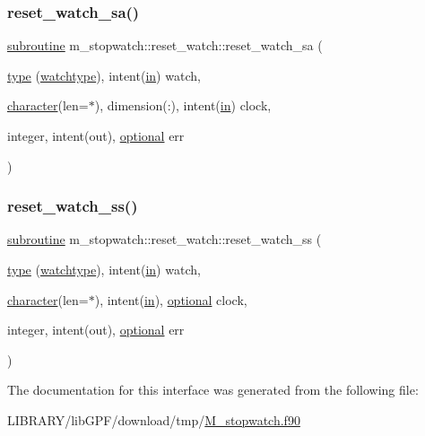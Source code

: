 \subsubsection{\texorpdfstring{reset\+\_\+watch\+\_\+sa()}{reset\_watch\_sa()}}
{\footnotesize\ttfamily \hyperlink{M__stopwatch_83_8txt_acfbcff50169d691ff02d4a123ed70482}{subroutine} m\+\_\+stopwatch\+::reset\+\_\+watch\+::reset\+\_\+watch\+\_\+sa (\begin{DoxyParamCaption}\item[{\hyperlink{stop__watch_83_8txt_a70f0ead91c32e25323c03265aa302c1c}{type} (\hyperlink{structm__stopwatch_1_1watchtype}{watchtype}), intent(\hyperlink{M__journal_83_8txt_afce72651d1eed785a2132bee863b2f38}{in})}]{watch,  }\item[{\hyperlink{option__stopwatch_83_8txt_abd4b21fbbd175834027b5224bfe97e66}{character}(len=$\ast$), dimension(\+:), intent(\hyperlink{M__journal_83_8txt_afce72651d1eed785a2132bee863b2f38}{in})}]{clock,  }\item[{integer, intent(out), \hyperlink{option__stopwatch_83_8txt_aa4ece75e7acf58a4843f70fe18c3ade5}{optional}}]{err }\end{DoxyParamCaption})\hspace{0.3cm}{\ttfamily [private]}}

\mbox{\label{interfacem__stopwatch_1_1reset__watch_ad5423f320af136dc18db5bbcf410ede1}} 
\subsubsection{\texorpdfstring{reset\+\_\+watch\+\_\+ss()}{reset\_watch\_ss()}}
{\footnotesize\ttfamily \hyperlink{M__stopwatch_83_8txt_acfbcff50169d691ff02d4a123ed70482}{subroutine} m\+\_\+stopwatch\+::reset\+\_\+watch\+::reset\+\_\+watch\+\_\+ss (\begin{DoxyParamCaption}\item[{\hyperlink{stop__watch_83_8txt_a70f0ead91c32e25323c03265aa302c1c}{type} (\hyperlink{structm__stopwatch_1_1watchtype}{watchtype}), intent(\hyperlink{M__journal_83_8txt_afce72651d1eed785a2132bee863b2f38}{in})}]{watch,  }\item[{\hyperlink{option__stopwatch_83_8txt_abd4b21fbbd175834027b5224bfe97e66}{character}(len=$\ast$), intent(\hyperlink{M__journal_83_8txt_afce72651d1eed785a2132bee863b2f38}{in}), \hyperlink{option__stopwatch_83_8txt_aa4ece75e7acf58a4843f70fe18c3ade5}{optional}}]{clock,  }\item[{integer, intent(out), \hyperlink{option__stopwatch_83_8txt_aa4ece75e7acf58a4843f70fe18c3ade5}{optional}}]{err }\end{DoxyParamCaption})\hspace{0.3cm}{\ttfamily [private]}}



The documentation for this interface was generated from the following file\+:\begin{DoxyCompactItemize}
\item 
L\+I\+B\+R\+A\+R\+Y/lib\+G\+P\+F/download/tmp/\hyperlink{M__stopwatch_8f90}{M\+\_\+stopwatch.\+f90}\end{DoxyCompactItemize}
